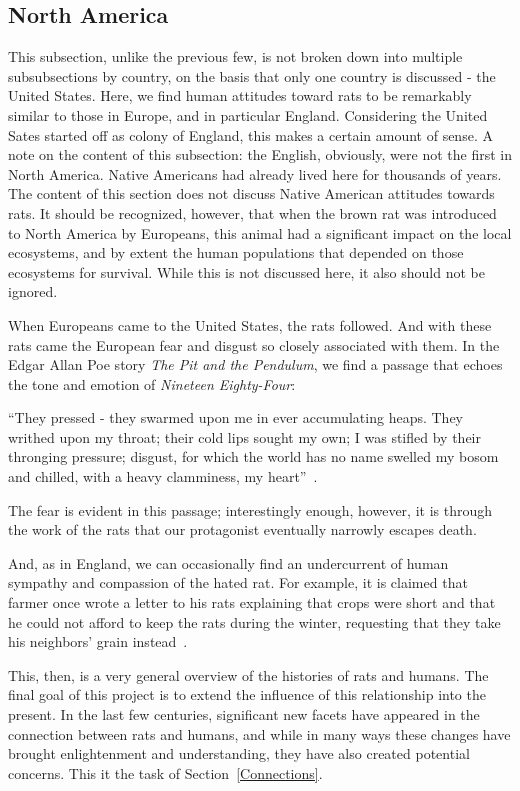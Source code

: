\documentclass[12pt]{article}
\begin{document}
\subsection{North America} \label{North America}

This subsection, unlike the previous few, is not broken down into multiple subsubsections by country, on the basis that only one country is discussed - the United States. Here, we find human attitudes toward rats to be remarkably similar to those in Europe, and in particular England. Considering the United Sates started off as colony of England, this makes a certain amount of sense. A note on the content of this subsection: the English, obviously, were not the first in North America. Native Americans had already lived here for thousands of years. The content of this section does not discuss Native American attitudes towards rats. It should be recognized, however, that when the brown rat was introduced to North America by Europeans, this animal had a significant impact on the local ecosystems, and by extent the human populations that depended on those ecosystems for survival. While this is not discussed here, it also should not be ignored.

When Europeans came to the United States, the rats followed. And with these rats came the European fear and disgust so closely associated with them. In the Edgar Allan Poe story \textit{The Pit and the Pendulum}, we find a passage that echoes the tone and emotion of \textit{Nineteen Eighty-Four}:

``They pressed - they swarmed upon me in ever accumulating heaps. They writhed upon my throat; their cold lips sought my own; I was stifled by their thronging pressure; disgust, for which the world has no name swelled my bosom and chilled, with a heavy clamminess, my heart''~\cite{ONeill}.

The fear is evident in this passage; interestingly enough, however, it is through the work of the rats that our protagonist eventually narrowly escapes death.

And, as in England, we can occasionally find an undercurrent of human sympathy and compassion of the hated rat. For example, it is claimed that farmer once wrote a letter to his rats explaining that crops were short and that he could not afford to keep the rats during the winter, requesting that they take his neighbors' grain instead~\cite{Barnett2001}.

This, then, is a very general overview of the histories of rats and humans. The final goal of this project is to extend the influence of this relationship into the present. In the last few centuries, significant new facets have appeared in the connection between rats and humans, and while in many ways these changes have brought enlightenment and understanding, they have also created potential concerns. This it the task of Section~\ref{Connections}.
\end{document}
